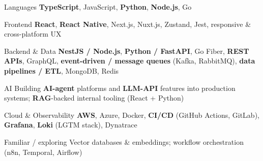 
\begin{cvskills}

  \cvskill
  {Languages}
  {\textbf{TypeScript}, JavaScript, \textbf{Python}, \textbf{Node.js}, Go}

  \cvskill
  {Frontend}
  {\textbf{React}, \textbf{React Native}, Next.js, Nuxt.js, Zustand, Jest, responsive \& cross-platform UX}

  \cvskill
  {Backend \& Data}
  {\textbf{NestJS / Node.js}, \textbf{Python / FastAPI}, Go Fiber, \textbf{REST APIs}, GraphQL, \textbf{event-driven / message queues} (Kafka, RabbitMQ), \textbf{data pipelines / ETL}, MongoDB, Redis}

  \cvskill
  {AI}
  {Building \textbf{AI-agent} platforms and \textbf{LLM-API} features into production systems; \textbf{RAG}-backed internal tooling (React + Python)}

  \cvskill
  {Cloud \& Observability}
  {\textbf{AWS}, Azure, Docker, \textbf{CI/CD} (GitHub Actions, GitLab), \textbf{Grafana}, \textbf{Loki} (LGTM stack), Dynatrace}

  \cvskill
  {Familiar / exploring}
  {Vector databases \& embeddings; workflow orchestration (n8n, Temporal, Airflow)}

\end{cvskills}
